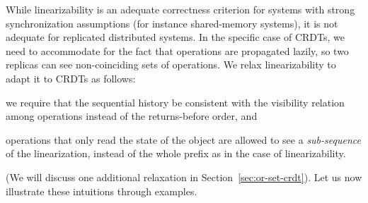While linearizability is an adequate correctness criterion for
systems with strong synchronization assumptions (for instance
shared-memory systems), it is not adequate for replicated distributed
systems.
%
In the specific case of CRDTs, we need to accommodate for the fact
that operations are propagated lazily, so two replicas can see
non-coinciding sets of operations.
%
We relax linearizability to adapt it to CRDTs as follows:
\begin{inparaenum}
\item we require that the sequential history be consistent with
the visibility relation among operations instead of the returns-before order, and
\item operations that only read the state of the object are allowed
to see a \emph{sub-sequence} of the linearization, instead of
the whole prefix as in the case of linearizability.
\end{inparaenum}
(We will discuss one additional relaxation in Section~\ref{sec:or-set-crdt}).
%
%
Let us now illustrate these intuitions through examples.

